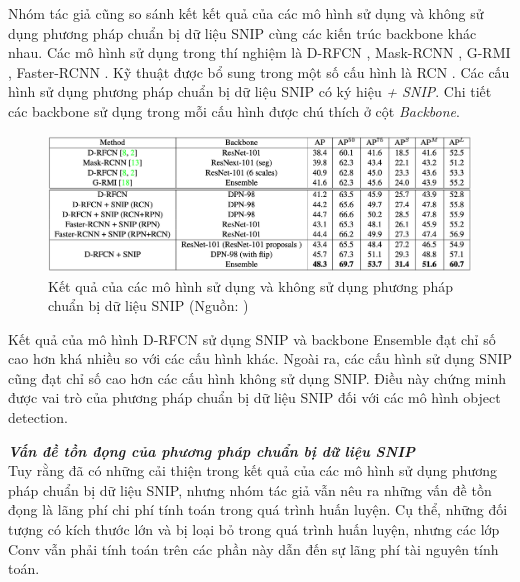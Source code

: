 {    \noindent
    Nhóm tác giả cũng so sánh kết kết quả của các mô hình sử dụng và không sử dụng phương pháp chuẩn bị dữ liệu SNIP cùng các kiến trúc backbone khác nhau.
    Các mô hình sử dụng trong thí nghiệm là D-RFCN \cite{}, Mask-RCNN \cite{}, G-RMI \cite{}, Faster-RCNN \cite{}.
    Kỹ thuật được bổ sung trong một số cấu hình là RCN \cite{}.
    Các cấu hình sử dụng phương pháp chuẩn bị dữ liệu SNIP có ký hiệu \textit{+ SNIP}.
    Chi tiết các backbone sử dụng trong mỗi cấu hình được chú thích ở cột \textit{Backbone}.
    
    \begin{figure}[H]
        \centering
        \includegraphics[width=16cm] {images/snip_results_2}
        \caption{Kết quả của các mô hình sử dụng và không sử dụng phương pháp chuẩn bị dữ liệu SNIP (Nguồn: \cite{singh2018analysis})}
        \label{fig:snip_results_2}
    \end{figure}

    \noindent
    Kết quả của mô hình D-RFCN sử dụng SNIP và backbone Ensemble đạt chỉ số cao hơn khá nhiều so với các cấu hình khác.
    Ngoài ra, các cấu hình sử dụng SNIP cũng đạt chỉ số cao hơn các cấu hình không sử dụng SNIP.
    Điều này chứng minh được vai trò của phương pháp chuẩn bị dữ liệu SNIP đối với các mô hình object detection.

    \noindent
    \textbf{\textit{Vấn đề tồn đọng của phương pháp chuẩn bị dữ liệu SNIP}} \\
    Tuy rằng đã có những cải thiện trong kết quả của các mô hình sử dụng phương pháp chuẩn bị dữ liệu SNIP, nhưng nhóm tác giả vẫn nêu ra những vấn đề tồn đọng là lãng phí chi phí tính toán trong quá trình huấn luyện.
    Cụ thể, những đối tượng có kích thước lớn và bị loại bỏ trong quá trình huấn luyện, nhưng các lớp Conv  vẫn phải tính toán trên các phần này dẫn đến sự lãng phí tài nguyên tính toán.
}